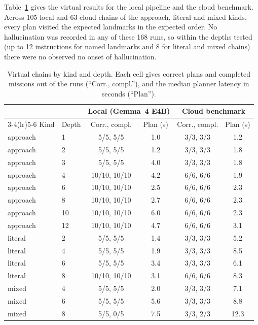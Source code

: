 Table~\ref{tab:rq2_depth} gives the virtual results for the local pipeline
 and the cloud benchmark. Across 105 local and 63 cloud chains of the 
 approach, literal and mixed kinds, every plan visited the expected 
 landmarks in the expected order. No hallucination was recorded in any of these 168 runs, 
 so within the depths tested (up to 12 instructions for named landmarks and 8 for literal and mixed chains) 
 there were no observed no onset of hallucination.

\begin{table}[htbp]
    \centering
    \caption{Virtual chains by kind and depth. Each cell gives correct plans and completed missions out of the runs (``Corr., compl.''), and the median planner latency in seconds (``Plan'').}
    \label{tab:rq2_depth}
    \small
    \setlength{\tabcolsep}{3pt}
    \begin{tabular}{llcccc}
        \toprule
        & & \multicolumn{2}{c}{Local (Gemma~4 E4B)} & \multicolumn{2}{c}{Cloud benchmark} \\
        \cmidrule(lr){3-4}\cmidrule(lr){5-6}
        Kind & Depth & Corr., compl. & Plan (s) & Corr., compl. & Plan (s) \\
        \midrule
        approach & 1 & 5/5, 5/5 & 1.0 & 3/3, 3/3 & 1.2 \\
        approach & 2 & 5/5, 5/5 & 1.2 & 3/3, 3/3 & 1.8 \\
        approach & 3 & 5/5, 5/5 & 4.0 & 3/3, 3/3 & 1.8 \\
        approach & 4 & 10/10, 10/10 & 4.2 & 6/6, 6/6 & 1.9 \\
        approach & 6 & 10/10, 10/10 & 2.5 & 6/6, 6/6 & 2.3 \\
        approach & 8 & 10/10, 10/10 & 2.7 & 6/6, 6/6 & 2.3 \\
        approach & 10 & 10/10, 10/10 & 6.0 & 6/6, 6/6 & 2.3 \\
        approach & 12 & 10/10, 10/10 & 4.7 & 6/6, 6/6 & 3.1 \\
        \midrule
        literal & 2 & 5/5, 5/5 & 1.4 & 3/3, 3/3 & 5.2 \\
        literal & 4 & 5/5, 5/5 & 1.9 & 3/3, 3/3 & 8.5 \\
        literal & 6 & 5/5, 5/5 & 3.4 & 3/3, 3/3 & 6.1 \\
        literal & 8 & 10/10, 10/10 & 3.1 & 6/6, 6/6 & 8.3 \\
        \midrule
        mixed & 4 & 5/5, 5/5 & 2.0 & 3/3, 3/3 & 7.1 \\
        mixed & 6 & 5/5, 5/5 & 5.6 & 3/3, 3/3 & 8.8 \\
        mixed & 8 & 5/5, 0/5 & 7.5 & 3/3, 2/3 & 12.3 \\
        \bottomrule
    \end{tabular}
\end{table}


